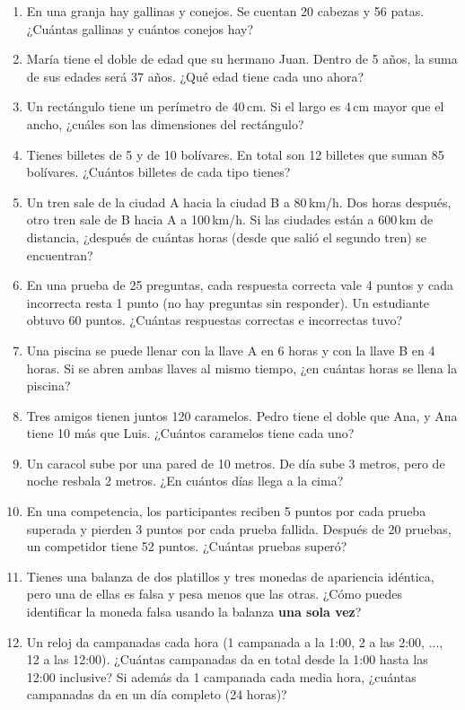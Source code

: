 \documentclass[12pt, a4paper]{article}
\begin{document}
\begin{enumerate}[leftmargin=*, resume]
  \item \facil{} En una granja hay gallinas y conejos. Se cuentan 20 cabezas y 56 patas. ¿Cuántas gallinas y cuántos conejos hay?

  \item \facil{} María tiene el doble de edad que su hermano Juan. Dentro de 5 años, la suma de sus edades será 37 años. ¿Qué edad tiene cada uno ahora?

  \item \facil{} Un rectángulo tiene un perímetro de 40\,cm. Si el largo es 4\,cm mayor que el ancho, ¿cuáles son las dimensiones del rectángulo?

  \item \facil{} Tienes billetes de 5 y de 10 bolívares. En total son 12 billetes que suman 85 bolívares. ¿Cuántos billetes de cada tipo tienes?

  \item \medio{} Un tren sale de la ciudad A hacia la ciudad B a 80\,km/h. Dos horas después, otro tren sale de B hacia A a 100\,km/h. Si las ciudades están a 600\,km de distancia, ¿después de cuántas horas (desde que salió el segundo tren) se encuentran?

  \item \medio{} En una prueba de 25 preguntas, cada respuesta correcta vale 4 puntos y cada incorrecta resta 1 punto (no hay preguntas sin responder). Un estudiante obtuvo 60 puntos. ¿Cuántas respuestas correctas e incorrectas tuvo?

  \item \medio{} Una piscina se puede llenar con la llave A en 6 horas y con la llave B en 4 horas. Si se abren ambas llaves al mismo tiempo, ¿en cuántas horas se llena la piscina?

  \item \medio{} Tres amigos tienen juntos 120 caramelos. Pedro tiene el doble que Ana, y Ana tiene 10 más que Luis. ¿Cuántos caramelos tiene cada uno?

  \item \dificil{} Un caracol sube por una pared de 10 metros. De día sube 3 metros, pero de noche resbala 2 metros. ¿En cuántos días llega a la cima?

  \item \dificil{} En una competencia, los participantes reciben 5 puntos por cada prueba superada y pierden 3 puntos por cada prueba fallida. Después de 20 pruebas, un competidor tiene 52 puntos. ¿Cuántas pruebas superó?

  \item \dificil{} Tienes una balanza de dos platillos y tres monedas de apariencia idéntica, pero una de ellas es falsa y pesa menos que las otras. ¿Cómo puedes identificar la moneda falsa usando la balanza \textbf{una sola vez}?

  \item \dificil{} Un reloj da campanadas cada hora (1 campanada a la 1:00, 2 a las 2:00, ..., 12 a las 12:00). ¿Cuántas campanadas da en total desde la 1:00 hasta las 12:00 inclusive? Si además da 1 campanada cada media hora, ¿cuántas campanadas da en un día completo (24 horas)?
\end{enumerate}
\end{document}
